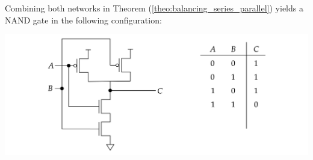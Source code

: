 \newpage
\begin{theo}

  \label{def:mosfet_logic_gate_nand}

  \noindent
  Combining both networks in Theorem (\ref{theo:balancing_series_parallel}) yields a NAND gate in the following configuration:

  \begin{center}
    \includegraphics[width=\textwidth]{Sections/circuits/nand.png}
  \end{center}
\end{theo}